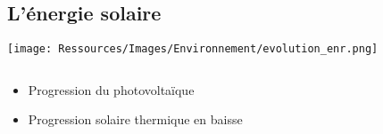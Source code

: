 \documentclass[xcolor=x11names, compress, 11pt]{beamer}
\begin{document}
\subsection{L’énergie solaire}
\begin{frame}[c]
    \vfill
    \centering
    \small
    \texttt{[image: Ressources/Images/Environnement/evolution\_enr.png]}
    \begin{columns}
        \begin{column}{0.45\textwidth}
            \begin{center}
                \begin{itemize}
                    \item Progression du photovoltaïque
                    \item Progression solaire thermique en baisse
                \end{itemize}
            \end{center}
        \end{column}%
        \begin{column}{0.45\textwidth}
            \begin{center}
            \end{center}
        \end{column}%
    \end{columns}%
    \vfill
\end{frame}
\end{document}
